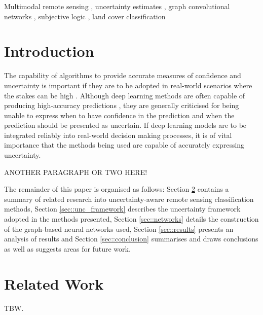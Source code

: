 \documentclass[
twocolumn,
]{ceurart}
\begin{document}
\begin{keywords}
  Multimodal remote sensing \sep
  uncertainty estimates \sep
  graph convolutional networks \sep
  subjective logic \sep
  land cover classification
\end{keywords}

\maketitle

\section{Introduction}
The capability of algorithms to provide accurate measures of confidence and uncertainty is important if they are to be adopted in real-world scenarios where the stakes can be high \cite{Goodman2017}.
Although deep learning methods are often capable of producing high-accuracy predictions \cite{LeCun2015, LiangpeiZhang2016}, they are generally criticised for being unable to express when to have confidence in the prediction and when the prediction should be presented as uncertain.
If deep learning models are to be integrated reliably into real-world decision making processes, it is of vital importance that the methods being used are capable of accurately expressing uncertainty.

ANOTHER PARAGRAPH OR TWO HERE!

The remainder of this paper is organised as follows: Section \ref{sec::related_work} contains a summary of related research into uncertainty-aware remote sensing classification methods, Section \ref{sec::unc_framework} describes the uncertainty framework adopted in the methods presented, Section \ref{sec::networks} details the construction of the graph-based neural networks used, Section \ref{sec::results} presents an analysis of results and Section \ref{sec::conclusion} summarises and draws conclusions as well as suggests areas for future work.

\section{Related Work}
\label{sec::related_work}
TBW.
\end{document}
